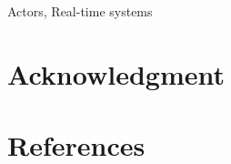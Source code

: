 \documentclass[conference]{IEEEtran}
\begin{document}
	\begin{IEEEkeywords}
		Actors, Real-time systems\end{IEEEkeywords}
	

%
%
%





	
	
	
	\section*{Acknowledgment}
	\section*{References}
	
	
	
	
	
	
\end{document}
